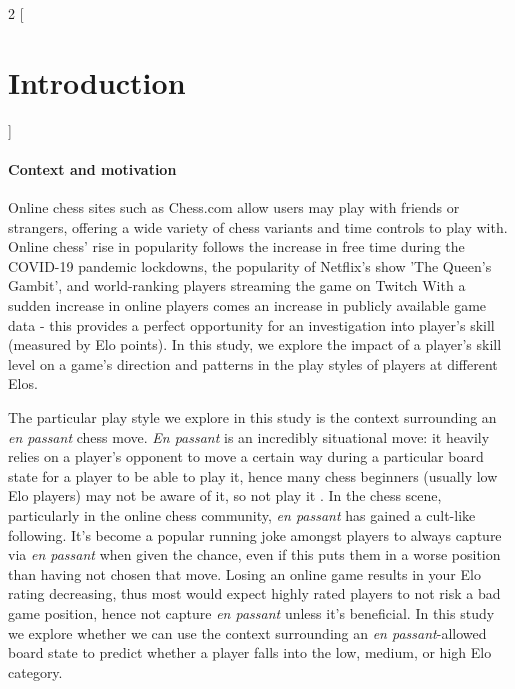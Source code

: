 \documentclass[10pt,a4paper]{article}
\begin{document}
\begin{multicols}{2}
[
\section{Introduction}
]

\paragraph{Context and motivation}

Online chess sites such as Chess.com allow users may play with friends or strangers, offering a wide variety of chess variants and time controls to play with. Online chess' rise in popularity follows the increase in free time during the COVID-19 pandemic lockdowns, the popularity of Netflix's show 'The Queen's Gambit', and world-ranking players streaming the game on Twitch \cite{The2020ChessBoom} With a sudden increase in online players comes an increase in publicly available game data - this provides a perfect opportunity for an investigation into player's skill (measured by Elo points). In this study, we explore the impact of a player's skill level on a game's direction and patterns in the play styles of players at different Elos. \newline

The particular play style we explore in this study is the context surrounding an \textit{en passant} chess move. \textit{En passant} is an incredibly situational move: it heavily relies on a player's opponent to move a certain way during a particular board state for a player to be able to play it, hence many chess beginners (usually low Elo players) may not be aware of it, so not play it \cite{EnPassant}. In the chess scene, particularly in the online chess community, \textit{en passant} has gained a cult-like following. It's become a popular running joke amongst players to always capture via \textit{en passant} when given the chance, even if this puts them in a worse position than having not chosen that move. Losing an online game results in your Elo rating decreasing, thus most would expect highly rated players to not risk a bad game position, hence not capture \textit{en passant} unless it's beneficial. In this study we explore whether we can use the context surrounding an \textit{en passant}-allowed board state to predict whether a player falls into the low, medium, or high Elo category. \newline


\end{multicols}
\end{document}
